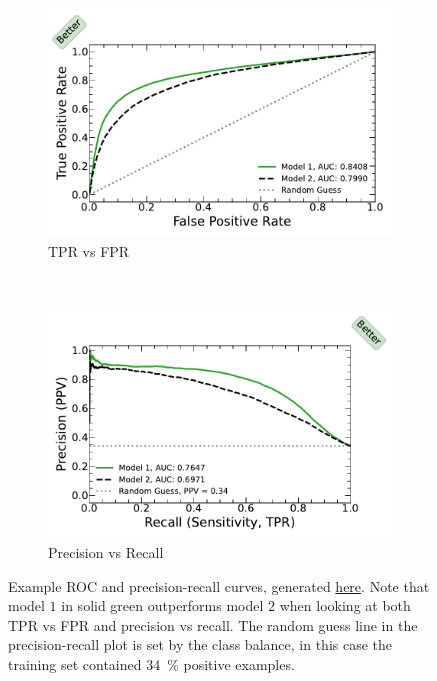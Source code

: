 \begin{figure}
\centering
  \begin{subfigure}[c]{0.48\textwidth}\centering
  \includegraphics[width=\textwidth,trim={0.18cm 0.3cm 0.18cm 0.3cm},clip]{figures/ml/roc_curves/roc_model_1_model_2}%
  \caption{TPR vs FPR}
  \label{fig:ml:roc:standard}
  \end{subfigure}
  ~
  \begin{subfigure}[c]{0.48\textwidth}\centering
  \includegraphics[width=\textwidth,trim={0.18cm 0.3cm 0.18cm 0.3cm},clip]{figures/ml/roc_curves/roc_precision_recall_model_1_model_2}%
  \caption{Precision vs Recall}
  \label{fig:ml:roc:precision_recall}
  \end{subfigure}
\caption{
Example ROC and precision-recall curves, generated \href{https://github.com/mepland/data_science_notes/blob/main/plots/plots.ipynb}{here}.
Note that model $1$ in solid green outperforms model $2$ when looking at both TPR vs FPR and precision vs recall.
The random guess line in the precision-recall plot is set by the class balance,
in this case the training set contained \SI{34}{\percent} positive examples.
}
\label{fig:ml:roc}
\end{figure}

